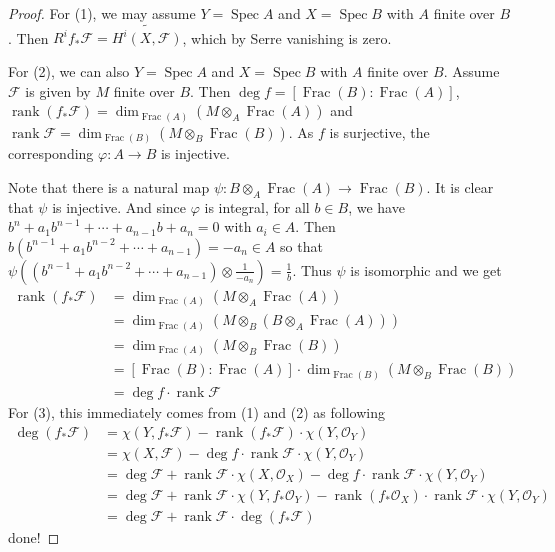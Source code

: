 \documentclass{ctexart}
\newcommand{\rank}{\operatorname{rank}}
\newcommand{\spec}{\operatorname{Spec}}
\newcommand{\fraction}{\operatorname{Frac}}
\begin{document}
\begin{proof}
    For (1), we may assume $Y = \spec A$ and $X = \spec B$ with $A$ finite over $B$.
    Then $R^{i}f_{\ast}\mathcal{F} = \widetilde{H^{i}(X, \mathcal{F})}$, which by Serre vanishing is zero.
    \par
    For (2), we can also $Y = \spec A$ and $X = \spec B$ with $A$ finite over $B$.
    Assume $\mathcal{F}$ is given by $M$ finite over $B$.
    Then $\deg f = [\fraction (B) : \fraction (A)]$, $\rank (f_{\ast}\mathcal{F}) = \dim_{\fraction (A)} (M \otimes_{A} \fraction (A))$ and $\rank \mathcal{F} = \dim_{\fraction (B)} (M \otimes_{B} \fraction (B))$.
    As $f$ is surjective, the corresponding $\varphi: A \rightarrow B$ is injective.
    \par
    Note that there is a natural map $\psi: B \otimes_{A} \fraction (A) \rightarrow \fraction (B)$.
    It is clear that $\psi$ is injective.
    And since $\varphi$ is integral, for all $b\in B$, we have $b^{n} + a_{1}b^{n - 1} + \cdots + a_{n - 1}b + a_{n} = 0$ with $a_{i}\in A$.
    Then $b(b^{n - 1} + a_{1}b^{n - 2} + \cdots + a_{n - 1}) = -a_{n}\in A$ so that $\psi((b^{n - 1} + a_{1}b^{n - 2} + \cdots + a_{n - 1}) \otimes \frac{1}{-a_{n}}) = \frac{1}{b}$.
    Thus $\psi$ is isomorphic and we get
    \begin{equation}
        \begin{split}
            \rank (f_{\ast}\mathcal{F}) & = \dim_{\fraction (A)} (M \otimes_{A} \fraction (A)) \\
            & = \dim_{\fraction (A)} (M \otimes_{B} (B \otimes_{A} \fraction (A))) \\
            & = \dim_{\fraction (A)} (M \otimes_{B} \fraction (B)) \\
            & = [\fraction (B) : \fraction (A)] \cdot \dim_{\fraction (B)} (M \otimes_{B} \fraction (B)) \\
            & = \deg f \cdot \rank \mathcal{F}
        \end{split}
    \end{equation}
    For (3), this immediately comes from (1) and (2) as following
    \begin{equation}
        \begin{split}
            \deg (f_{\ast}\mathcal{F}) & = \chi(Y, f_{\ast}\mathcal{F}) - \rank (f_{\ast}\mathcal{F}) \cdot \chi(Y, \mathcal{O}_{Y}) \\
            & = \chi(X, \mathcal{F}) - \deg f \cdot \rank \mathcal{F} \cdot \chi(Y, \mathcal{O}_{Y}) \\
            & = \deg \mathcal{F} + \rank \mathcal{F} \cdot \chi(X, \mathcal{O}_{X}) - \deg f \cdot \rank \mathcal{F} \cdot \chi(Y, \mathcal{O}_{Y}) \\
            & = \deg \mathcal{F} + \rank \mathcal{F} \cdot \chi(Y, f_{\ast}\mathcal{O}_{Y}) - \rank (f_{\ast}\mathcal{O}_{X}) \cdot \rank \mathcal{F} \cdot \chi(Y, \mathcal{O}_{Y}) \\
            & = \deg \mathcal{F} + \rank \mathcal{F} \cdot \deg (f_{\ast}\mathcal{F})
        \end{split}
    \end{equation}
    done!
\end{proof}
\end{document}
